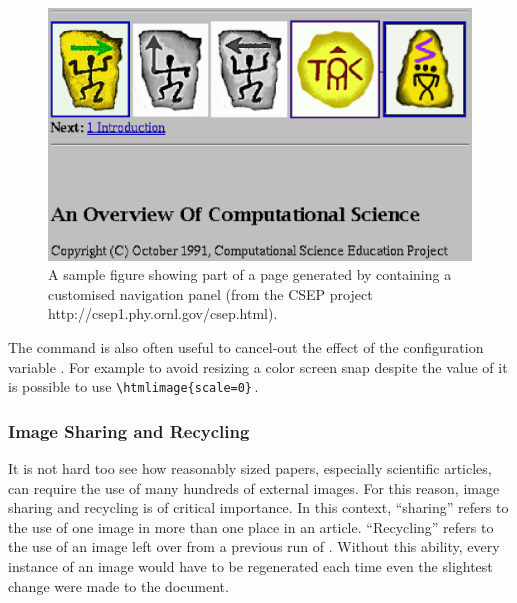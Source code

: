 %
%
%
% 
\begin{figure}[hbt]
    \centering \includegraphics[width=5in]{psfiles/figure.ps}
    \latex{\addtocounter{footnote}{-1}}%
    \caption{A sample figure showing part of a page generated by
       \protect\latextohtml{} containing a customised navigation panel 
       (from the \htmladdnormallink
        {CSEP project\protect\latex{\protect\footnotemark}}%
        {http://csep1.phy.ornl.gov/csep.html}).}\label{fig:example}
\end{figure}


%

\noindent
The  command is also often useful to cancel-out the
effect of the configuration variable .
For example to avoid resizing a color screen snap despite 
the value of  it is possible to 
use \verb|\htmlimage{scale=0}|\,.


\subsubsection{Image Sharing and Recycling\label{recycling}}%
%
It is not hard too see how reasonably sized papers,
especially scientific articles, can require
the use of many hundreds of external images.  For this reason,
image sharing and recycling is of critical importance.
In this context, ``sharing'' refers to the use of one
image in more than one place in an article.  ``Recycling''
refers to the use of an image left over from a previous
run of \latextohtml.  Without this ability, every instance of an
image would have to be regenerated each time even the
slightest change were made to the document.


